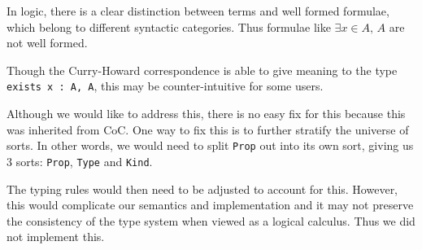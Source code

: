 \documentclass{article}
\begin{document}
In logic, there is a clear distinction between terms and well formed formulae,
which belong to different syntactic categories.
Thus formulae like $\exists x \in A, \, A$ are not well formed.

Though the Curry-Howard correspondence is able to give meaning to the type
\verb|exists x : A, A|, this may be counter-intuitive for some users. 

Although we would like to address this, there is no easy fix for this because
this was inherited from CoC. One way to fix this is to further stratify the
universe of sorts. In other words, we would need to split \texttt{Prop} out 
into its own sort, giving us 3 sorts: \texttt{Prop}, \texttt{Type} and
\texttt{Kind}.

The typing rules would then need to be adjusted to account for this.
However, this would complicate our semantics and implementation and it may not
preserve the consistency of the type system when viewed as a logical calculus.
Thus we did not implement this.





\end{document}
